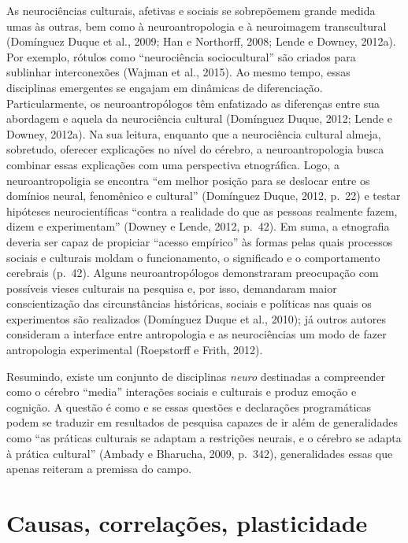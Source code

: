 As neurociências culturais, afetivas e sociais se sobrepõemem grande
medida umas às outras, bem como à neuroantropologia e à neuroimagem
transcultural (Domínguez Duque et al., 2009; Han e Northorff, 2008;
Lende e Downey, 2012a). Por exemplo, rótulos como ``neurociência
sociocultural'' são criados para sublinhar interconexões (Wajman et al.,
2015). Ao mesmo tempo, essas disciplinas emergentes se engajam em
dinâmicas de diferenciação. Particularmente, os neuroantropólogos têm
enfatizado as diferenças entre sua abordagem e aquela da neurociência
cultural (Domínguez Duque, 2012; Lende e Downey, 2012a). Na sua leitura,
enquanto que a neurociência cultural almeja, sobretudo, oferecer
explicações no nível do cérebro, a neuroantropologia busca combinar
essas explicações com uma perspectiva etnográfica. Logo, a
neuroantropoligia se encontra ``em melhor posição para se deslocar entre
os domínios neural, fenomênico e cultural'' (Domínguez Duque, 2012,
p.~22) e testar hipóteses neurocientíficas ``contra a realidade do que as
pessoas realmente fazem, dizem e experimentam'' (Downey e Lende, 2012,
p.~42). Em suma, a etnografia deveria ser capaz de propiciar ``acesso
empírico'' às formas pelas quais processos sociais e culturais moldam o
funcionamento, o significado e o comportamento cerebrais (p.~42). Alguns
neuroantropólogos demonstraram preocupação com possíveis vieses
culturais na pesquisa e, por isso, demandaram maior conscientização das
circunstâncias históricas, sociais e políticas nas quais os experimentos
são realizados (Domínguez Duque et al., 2010); já outros autores
consideram a interface entre antropologia e as neurociências um modo de
fazer antropologia experimental (Roepstorff e Frith, 2012).

Resumindo, existe um conjunto de disciplinas \emph{neuro} destinadas a
compreender como o cérebro ``media'' interações sociais e culturais e
produz emoção e cognição. A questão é como e se essas questões e
declarações programáticas podem se traduzir em resultados de pesquisa
capazes de ir além de generalidades como ``as práticas culturais se
adaptam a restrições neurais, e o cérebro se adapta à prática cultural''
(Ambady e Bharucha, 2009, p.~342), generalidades essas que apenas
reiteram a premissa do campo.

\chapter{Causas, correlações, plasticidade}

